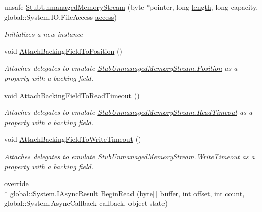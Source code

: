 \begin{DoxyCompactItemize}
unsafe \hyperlink{class_system_1_1_i_o_1_1_fakes_1_1_stub_unmanaged_memory_stream_a0a93e491d2163d3a9de2fc21fa3a54d7}{Stub\-Unmanaged\-Memory\-Stream} (byte $\ast$pointer, long \hyperlink{jquery-1_810_82-vsdoc_8js_aa7de35d58da66d9944ab9cbe82c19640}{length}, long capacity, global\-::\-System.\-I\-O.\-File\-Access \hyperlink{jquery-1_810_82-vsdoc_8js_a130ad18d21e14ee566dbf4eb185f2bda}{access})
\begin{DoxyCompactList}\small\item\em Initializes a new instance\end{DoxyCompactList}\item 
void \hyperlink{class_system_1_1_i_o_1_1_fakes_1_1_stub_unmanaged_memory_stream_ae303c3328f1ac9a628179e98cbb430ed}{Attach\-Backing\-Field\-To\-Position} ()
\begin{DoxyCompactList}\small\item\em Attaches delegates to emulate \hyperlink{class_system_1_1_i_o_1_1_fakes_1_1_stub_unmanaged_memory_stream_ab7f63a0c3b885888bd89a2a8d8b86788}{Stub\-Unmanaged\-Memory\-Stream.\-Position} as a property with a backing field.\end{DoxyCompactList}\item 
void \hyperlink{class_system_1_1_i_o_1_1_fakes_1_1_stub_unmanaged_memory_stream_a4bcfcc2297457dbf072612a66e67e91d}{Attach\-Backing\-Field\-To\-Read\-Timeout} ()
\begin{DoxyCompactList}\small\item\em Attaches delegates to emulate \hyperlink{class_system_1_1_i_o_1_1_fakes_1_1_stub_unmanaged_memory_stream_adea7e365f22e2357d86680344e49e649}{Stub\-Unmanaged\-Memory\-Stream.\-Read\-Timeout} as a property with a backing field.\end{DoxyCompactList}\item 
void \hyperlink{class_system_1_1_i_o_1_1_fakes_1_1_stub_unmanaged_memory_stream_a0d805ceb34ca7440320a02f3b351e8d9}{Attach\-Backing\-Field\-To\-Write\-Timeout} ()
\begin{DoxyCompactList}\small\item\em Attaches delegates to emulate \hyperlink{class_system_1_1_i_o_1_1_fakes_1_1_stub_unmanaged_memory_stream_aa26b397c0e12263c9812f3dd9d9fa959}{Stub\-Unmanaged\-Memory\-Stream.\-Write\-Timeout} as a property with a backing field.\end{DoxyCompactList}\item 
override \\*
global\-::\-System.\-I\-Async\-Result \hyperlink{class_system_1_1_i_o_1_1_fakes_1_1_stub_unmanaged_memory_stream_af3d04e51706cbf58d64099702108ea22}{Begin\-Read} (byte\mbox{[}$\,$\mbox{]} buffer, int \hyperlink{jquery-1_810_82_8js_a4a9f594d20d927164551fc7fa4751a2f}{offset}, int count, global\-::\-System.\-Async\-Callback callback, object state)

\end{DoxyCompactItemize}
